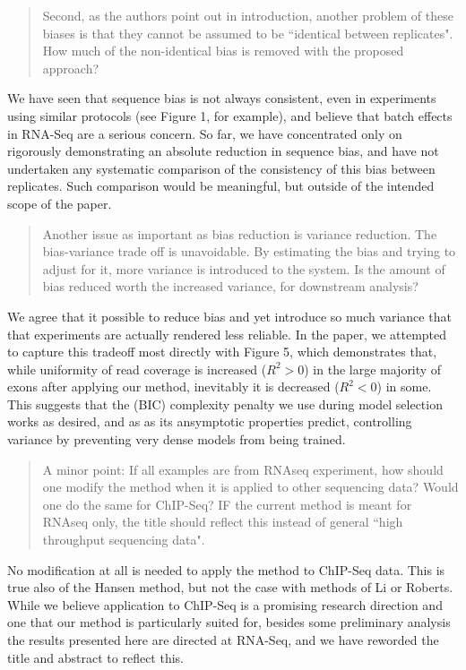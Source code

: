 \documentclass{article}
\begin{document}
\begin{quote}
Second, as the authors point out in introduction, another problem of
these biases is that they cannot be assumed to be ``identical between
replicates". How much of the non-identical bias is removed with the
proposed approach?
\end{quote}

We have seen that sequence bias is not always consistent, even in experiments
using similar protocols (see Figure 1, for example), and believe that batch
effects in RNA-Seq are a serious concern. So far, we have concentrated only on
rigorously demonstrating an absolute reduction in sequence bias, and have not
undertaken any systematic comparison of the consistency of this bias between
replicates. Such comparison would be meaningful, but outside of the intended
scope of the paper.


\begin{quote}
Another issue as important as bias reduction is variance reduction. The
bias-variance trade off is unavoidable. By estimating the bias and trying to
adjust for it, more variance is introduced to the system. Is the amount of bias
reduced worth the increased variance, for downstream analysis?
\end{quote}

We agree that it possible to reduce bias and yet introduce so much variance that
that experiments are actually rendered less reliable. In the paper, we attempted
to capture this tradeoff most directly with Figure 5, which demonstrates that,
while uniformity of read coverage is increased ($R^2 > 0$) in the large majority
of exons after applying our method, inevitably it is decreased ($R^2 < 0$) in
some. This suggests that the (BIC) complexity penalty we use during model
selection works as desired, and as as its ansymptotic properties predict,
controlling variance by preventing very dense models from being trained.


\begin{quote}
A minor point: If all examples are from RNAseq experiment, how should
one modify the method when it is applied to other sequencing data?
Would one do the same for ChIP-Seq? IF the current method is meant for
RNAseq only, the title should reflect this instead of general ``high
throughput sequencing data".
\end{quote}

No modification at all is needed to apply the method to ChIP-Seq data. This is
true also of the Hansen method, but not the case with methods of Li or Roberts.
While we believe application to ChIP-Seq is a promising research direction and
one that our method is particularly suited for, besides some preliminary
analysis the results presented here are directed at RNA-Seq, and we have
reworded the title and abstract to reflect this.
\end{document}
